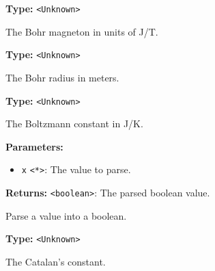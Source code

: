 \documentclass[12pt,a4paper]{article}
\begin{document}
\vspace{5mm}
\noindent {}\vspace{4mm}


\noindent \textbf{Type:} \texttt{<Unknown>}

\noindent The Bohr magneton in units of \textasciigrave{}J/T\textasciigrave{}.

\vspace{5mm}
\noindent {}\vspace{4mm}


\noindent \textbf{Type:} \texttt{<Unknown>}

\noindent The Bohr radius in meters.

\vspace{5mm}
\noindent {}\vspace{4mm}


\noindent \textbf{Type:} \texttt{<Unknown>}

\noindent The Boltzmann constant in \textasciigrave{}J/K\textasciigrave{}.

\vspace{5mm}
\noindent {}


\noindent \textbf{Parameters:}
\begin{itemize}
  \item \texttt{x} \texttt{<*>}: The value to parse.
\end{itemize}

\noindent \textbf{Returns:} \texttt{<boolean>}: The parsed boolean value.

\noindent Parse a value into a boolean.

\vspace{5mm}
\noindent {}\vspace{4mm}


\noindent \textbf{Type:} \texttt{<Unknown>}

\noindent The Catalan's constant.

\vspace{5mm}
\noindent {}
\end{document}
